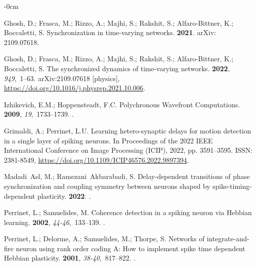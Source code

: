 \documentclass[brainsci, %
               review,submit,pdftex,moreauthors
               ]{Definitions/mdpi}
\begin{document}
\begin{adjustwidth}{-\extralength}{0cm}
\begin{thebibliography}{999}
  Ghosh, D.; Frasca, M.; Rizzo, A.; Majhi, S.; Rakshit, S.; Alfaro-Bittner, K.;
    Boccaletti, S.
  \newblock Synchronization in time-varying networks.
   {\bf 2021}.
   arXiv: 2109.07618.
  
  Ghosh, D.; Frasca, M.; Rizzo, A.; Majhi, S.; Rakshit, S.; Alfaro-Bittner, K.;
    Boccaletti, S.
  \newblock The synchronized dynamics of time-varying networks.
   {\bf 2022}, {\em 949},~1--63.
  \newblock arXiv:2109.07618 [physics],
    {\url{https://doi.org/10.1016/j.physrep.2021.10.006}}.
  
  Izhikevich, E.M.; Hoppensteadt, F.C.
  \newblock Polychronous {Wavefront} {Computations}.
   {\bf 2009}, {\em
    19},~1733--1739.
  .
  
  Grimaldi, A.; Perrinet, L.U.
  \newblock Learning hetero-synaptic delays for motion detection in a single
    layer of spiking neurons.
  \newblock In Proceedings of the 2022 {IEEE} {International} {Conference} on
    {Image} {Processing} ({ICIP}),  2022, pp. 3591--3595.
  \newblock ISSN: 2381-8549,
    {\url{https://doi.org/10.1109/ICIP46576.2022.9897394}}.
  
  Madadi~Asl, M.; Ramezani~Akbarabadi, S.
  \newblock Delay-dependent transitions of phase synchronization and coupling
    symmetry between neurons shaped by spike-timing-dependent plasticity.
   {\bf 2022}.
  .
  
  Perrinet, L.; Samuelides, M.
  \newblock Coherence detection in a spiking neuron via {Hebbian} learning.
   {\bf 2002}, {\em 44-46},~133--139.
  .
  
  Perrinet, L.; Delorme, A.; Samuelides, M.; Thorpe, S.
  \newblock Networks of integrate-and-fire neuron using rank order coding {A}:
    {How} to implement spike time dependent {Hebbian} plasticity.
   {\bf 2001}, {\em 38-40},~817--822.
  .
  

\end{thebibliography}
\end{adjustwidth}
\end{document}
